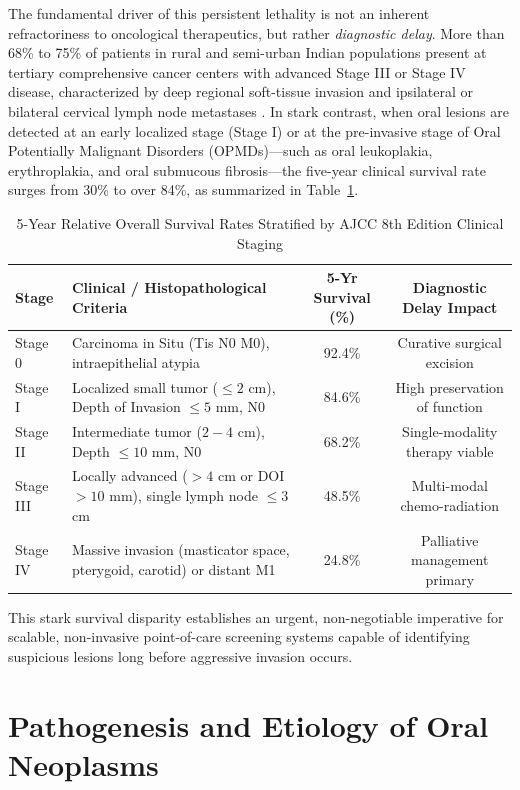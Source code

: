 \documentclass[12pt,a4paper,oneside]{report}
\begin{document}
The fundamental driver of this persistent lethality is not an inherent refractoriness to oncological therapeutics, but rather \textit{diagnostic delay}. More than 68\% to 75\% of patients in rural and semi-urban Indian populations present at tertiary comprehensive cancer centers with advanced Stage III or Stage IV disease, characterized by deep regional soft-tissue invasion and ipsilateral or bilateral cervical lymph node metastases \cite{amin2017ajcc}. In stark contrast, when oral lesions are detected at an early localized stage (Stage I) or at the pre-invasive stage of Oral Potentially Malignant Disorders (OPMDs)---such as oral leukoplakia, erythroplakia, and oral submucous fibrosis---the five-year clinical survival rate surges from 30\% to over 84\%, as summarized in Table~\ref{tab:survival_staging}.

\begin{table}[H]
\centering
\caption{5-Year Relative Overall Survival Rates Stratified by AJCC 8th Edition Clinical Staging}
\label{tab:survival_staging}
\begin{tabularx}{\textwidth}{l X c c}
\toprule
\textbf{Stage} & \textbf{Clinical / Histopathological Criteria} & \textbf{5-Yr Survival (\%)} & \textbf{Diagnostic Delay Impact} \\
\midrule
Stage 0 & Carcinoma in Situ (Tis N0 M0), intraepithelial atypia & 92.4\% & Curative surgical excision \\
Stage I & Localized small tumor ($\le 2$ cm), Depth of Invasion $\le 5$ mm, N0 & 84.6\% & High preservation of function \\
Stage II & Intermediate tumor ($2-4$ cm), Depth $\le 10$ mm, N0 & 68.2\% & Single-modality therapy viable \\
Stage III & Locally advanced ($>4$ cm or DOI $>10$ mm), single lymph node $\le 3$ cm & 48.5\% & Multi-modal chemo-radiation \\
Stage IV & Massive invasion (masticator space, pterygoid, carotid) or distant M1 & 24.8\% & Palliative management primary \\
\bottomrule
\end{tabularx}
\end{table}

This stark survival disparity establishes an urgent, non-negotiable imperative for scalable, non-invasive point-of-care screening systems capable of identifying suspicious lesions long before aggressive invasion occurs.

\section{Pathogenesis and Etiology of Oral Neoplasms}
\label{sec:pathogenesis}
\end{document}
